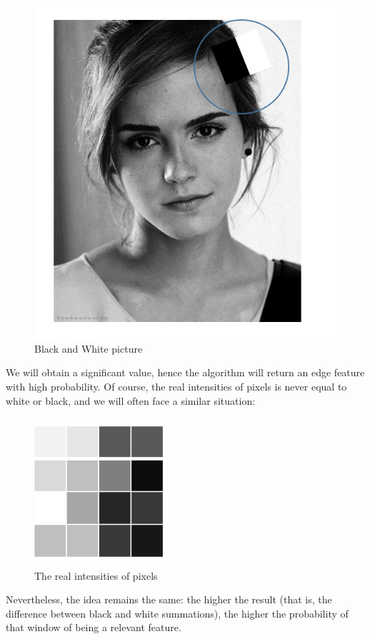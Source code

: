             \begin{figure}[H]
                \centering
                \includegraphics[width=0.6\linewidth]{img/Emma.png}
                \caption{Black and White picture}
            \end{figure}
            We will obtain a significant value, hence the algorithm will return an edge feature with high probability. Of course, the real intensities of pixels is never equal to white or black, and we will often face a similar situation:
            \begin{figure}[H]
                \centering
                \includegraphics[width=0.6\linewidth]{img/real_pixel.png}
                \caption{The real intensities of pixels}
            \end{figure}
            Nevertheless, the idea remains the same: the higher the result (that is, the difference between black and white summations), the higher the probability of that window of being a relevant feature. \\ 
